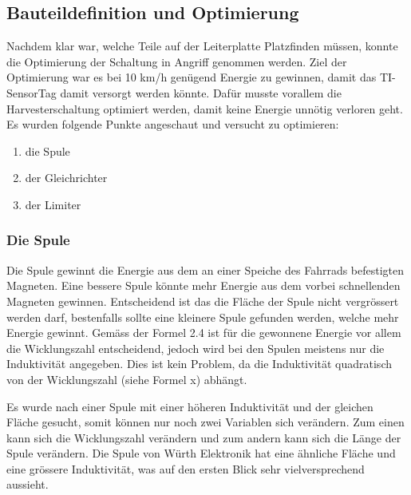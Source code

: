 \newpage
\subsection{Bauteildefinition und Optimierung}

Nachdem klar war, welche Teile auf der Leiterplatte Platzfinden müssen, konnte die Optimierung der Schaltung in Angriff genommen werden. Ziel der Optimierung war es bei 10 km/h genügend Energie zu gewinnen, damit das TI-SensorTag damit versorgt werden könnte. Dafür musste vorallem die Harvesterschaltung optimiert werden, damit keine Energie unnötig verloren geht. 
Es wurden folgende Punkte angeschaut und versucht zu optimieren:

\begin{enumerate}
    \item die Spule
    \item der Gleichrichter
    \item der Limiter
\end{enumerate}

\subsubsection{Die Spule}

Die Spule gewinnt die Energie aus dem an einer Speiche des Fahrrads befestigten Magneten. Eine bessere Spule könnte mehr Energie aus dem vorbei schnellenden Magneten gewinnen. Entscheidend ist das die Fläche der Spule nicht vergrössert werden darf, bestenfalls sollte eine kleinere Spule gefunden werden, welche mehr Energie gewinnt. Gemäss der Formel 2.4 ist für die gewonnene Energie vor allem die Wicklungszahl entscheidend, jedoch wird bei den Spulen meistens nur die Induktivität angegeben. Dies ist kein Problem, da die Induktivität quadratisch von der Wicklungszahl (siehe Formel x) abhängt.


Es wurde nach einer Spule mit einer höheren Induktivität und der gleichen Fläche gesucht, somit können nur noch zwei Variablen sich verändern. Zum einen kann sich die Wicklungszahl verändern und zum andern kann sich die Länge der Spule verändern. Die Spule von Würth Elektronik hat eine ähnliche Fläche und eine grössere Induktivität, was auf den ersten Blick sehr vielversprechend aussieht.

